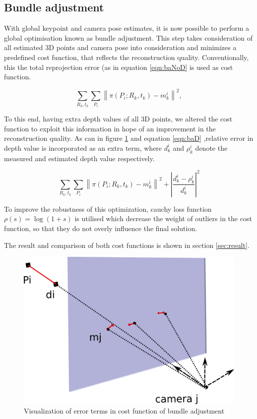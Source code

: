 \documentclass[10pt,twocolumn,letterpaper]{article}
\newcommand{\norm}[1]{\left\lVert #1 \right\rVert}
\begin{document}

\subsection{Bundle adjustment}
With global keypoint and camera pose estimates, it is now possible to perform a global optimisation known as bundle adjustment. This step takes consideration of all estimated 3D points and camera pose into consideration and minimizes a predefined cost function, that reflects the reconstruction quality. Conventionally, this the total reprojection error (as in equation \ref{eqn:baNoD} is used as cost function.

\begin{equation}\label{eqn:baNoD}
\sum_{R_k,t_k}\sum_{P_i}{\norm{\pi\left(P_i;R_k,t_k\right)-m^i_{k}}}^2,
\end{equation}

To this end, having extra depth values of all 3D points, we altered the cost function to exploit this information in hope of an improvement in the reconstruction quality. As can in figure \ref{fig:baCost} and equation \ref{eqn:baD} ,relative error in depth value is incorporated as an extra term, where $d^i_k$ and $\rho^i_k$ denote the measured and estimated depth value respectively.

\begin{equation}\label{eqn:baD}
\sum_{R_k,t_k}\sum_{P_i}{\norm{\pi\left(P_i;R_k,t_k\right)-m^i_{k}}^2+\left\lvert\dfrac{d^i_k-\rho^i_k}{d^i_k}\right\rvert ^2}
\end{equation}

To improve the robustness of this optimization, cauchy loss function $\rho(s) = \log(1+s)$ is utilised which decrease the weight of outliers in the cost function, so that they do not overly influence the final solution.

The result and comparison of both cost functions is shown in section \ref{sec:result}.

\begin{figure}[t]
\begin{center}
   \includegraphics[width=0.9\linewidth]{figures/ba.pdf}
\end{center}
\caption{Visualization of error terms in cost function of bundle adjustment}
\label{fig:baCost}
\end{figure}
\end{document}

